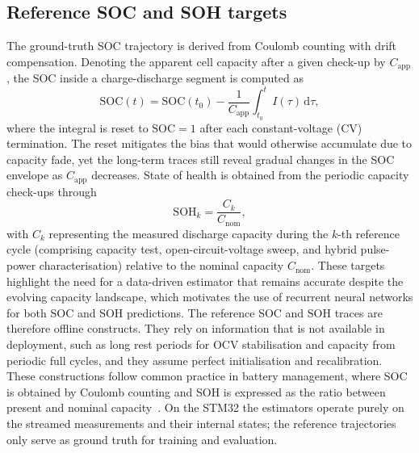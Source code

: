 \documentclass[review]{elsarticle}
\begin{document}
\subsection{Reference SOC and SOH targets}
The ground-truth SOC trajectory is derived from Coulomb counting with drift compensation. Denoting the apparent cell capacity after a given check-up by $C_{\mathrm{app}}$, the SOC inside a charge-discharge segment is computed as
\begin{equation}
    \mathrm{SOC}(t) = \mathrm{SOC}(t_0) - \frac{1}{C_{\mathrm{app}}}\int_{t_0}^{t} I(\tau)\,\mathrm{d}\tau,
\end{equation}
where the integral is reset to $\mathrm{SOC}=1$ after each constant-voltage (CV) termination. The reset mitigates the bias that would otherwise accumulate due to capacity fade, yet the long-term traces still reveal gradual changes in the SOC envelope as $C_{\mathrm{app}}$ decreases.
State of health is obtained from the periodic capacity check-ups through
\begin{equation}
    \mathrm{SOH}_k = \frac{C_k}{C_{\mathrm{nom}}},
\end{equation}
with $C_k$ representing the measured discharge capacity during the $k$-th reference cycle (comprising capacity test, open-circuit-voltage sweep, and hybrid pulse-power characterisation) relative to the nominal capacity $C_{\mathrm{nom}}$. These targets highlight the need for a data-driven estimator that remains accurate despite the evolving capacity landscape, which motivates the use of recurrent neural networks for both SOC and SOH predictions.
The reference SOC and SOH traces are therefore offline constructs. They rely on information that is not available in deployment, such as long rest periods for OCV stabilisation and capacity from periodic full cycles, and they assume perfect initialisation and recalibration. These constructions follow common practice in battery management, where SOC is obtained by Coulomb counting and SOH is expressed as the ratio between present and nominal capacity~\cite{plettBatteryManagementSystems2015,a.m.s.m.h.s.attanayakaEstimationStateCharge2019,berecibarCriticalReviewState2016}. On the STM32 the estimators operate purely on the streamed measurements and their internal states; the reference trajectories only serve as ground truth for training and evaluation.
\end{document}
